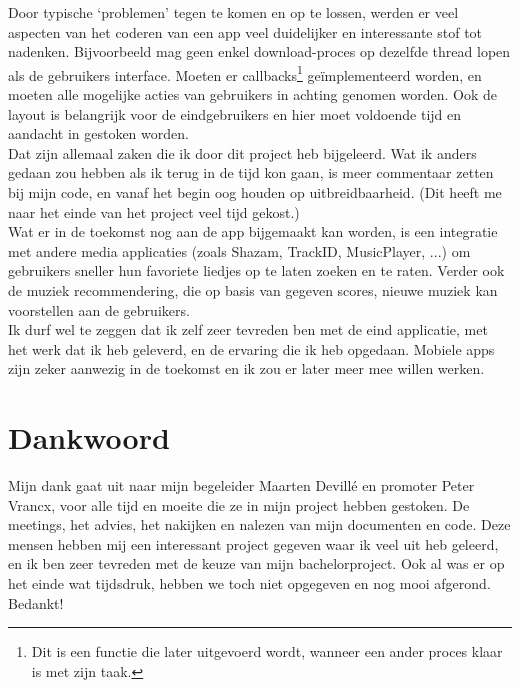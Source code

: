 \documentclass[11pt,a4paper]{article}
\begin{document}
Door typische `problemen' tegen te komen en op te lossen, werden er veel aspecten van het coderen van een app veel duidelijker en interessante stof tot nadenken. Bijvoorbeeld mag geen enkel download-proces op dezelfde thread lopen als de gebruikers interface. Moeten er callbacks\footnote{Dit is een functie die later uitgevoerd wordt, wanneer een ander proces klaar is met zijn taak.} geïmplementeerd worden, en moeten alle mogelijke acties van gebruikers in achting genomen worden. Ook de layout is belangrijk voor de eindgebruikers en hier moet voldoende tijd en aandacht in gestoken worden. \\

Dat zijn allemaal zaken die ik door dit project heb bijgeleerd. Wat ik anders gedaan zou hebben als ik terug in de tijd kon gaan, is meer commentaar zetten bij mijn code, en vanaf het begin oog houden op uitbreidbaarheid. (Dit heeft me naar het einde van het project veel tijd gekost.) \\

Wat er in de toekomst nog aan de app bijgemaakt kan worden, is een integratie met andere media applicaties (zoals Shazam, TrackID, MusicPlayer, ...) om gebruikers sneller hun favoriete liedjes op te laten zoeken en te raten. Verder ook de muziek recommendering, die op basis van gegeven scores, nieuwe muziek kan voorstellen aan de gebruikers. \\

Ik durf wel te zeggen dat ik zelf zeer tevreden ben met de eind applicatie, met het werk dat ik heb geleverd, en de ervaring die ik heb opgedaan. Mobiele apps zijn zeker aanwezig in de toekomst en ik zou er later meer mee willen werken. 



\section{Dankwoord}
\label{sec:dank}

Mijn dank gaat uit naar mijn begeleider Maarten Devillé en promoter Peter Vrancx, voor alle tijd en moeite die ze in mijn project hebben gestoken. De meetings, het advies, het nakijken en nalezen van mijn documenten en code. Deze mensen hebben mij een interessant project gegeven waar ik veel uit heb geleerd, en ik ben zeer tevreden met de keuze van mijn bachelorproject. Ook al was er op het einde wat tijdsdruk, hebben we toch niet opgegeven en nog mooi afgerond. Bedankt! \\

\newpage	
\end{document}
